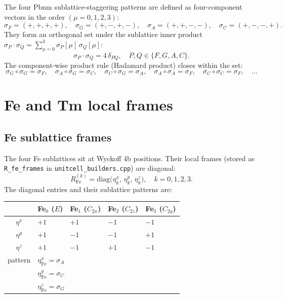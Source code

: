 \documentclass[11pt,a4paper]{article}
\newcommand{\sF}{\sigma_F}
\newcommand{\sG}{\sigma_G}
\newcommand{\sA}{\sigma_A}
\newcommand{\sC}{\sigma_C}
\newcommand{\etaz}{\eta^z}
\newcommand{\etax}{\eta^x}
\newcommand{\etay}{\eta^y}
\newcommand{\diag}{\mathrm{diag}}
\begin{document}
The four Pbnm sublattice-staggering patterns are defined as four-component
vectors in the order $(\mu=0,1,2,3)$:
\begin{equation}
  \sF = (+,+,+,+), \quad
  \sG = (+,-,+,-), \quad
  \sA = (+,+,-,-), \quad
  \sC = (+,-,-,+).
\end{equation}
They form an orthogonal set under the sublattice inner product
$\sigma_P \cdot \sigma_Q = \sum_{\mu=0}^{3} \sigma_P[\mu]\,\sigma_Q[\mu]$:
\begin{equation}
  \sigma_P \cdot \sigma_Q = 4\,\delta_{PQ},
  \quad P,Q \in \{F,G,A,C\}.
  \label{eq:orth}
\end{equation}
The component-wise product rule (Hadamard product) closes within the set:
\begin{equation}
  \sG \circ \sG = \sF, \quad
  \sA \circ \sG = \sC, \quad
  \sC \circ \sG = \sA, \quad
  \sA \circ \sA = \sF, \quad
  \sC \circ \sC = \sF, \quad \ldots
  \label{eq:had}
\end{equation}

\section{Fe and Tm local frames}
\label{sec:frames}

\subsection{Fe sublattice frames}

The four Fe sublattices sit at Wyckoff 4b positions.  Their local frames
(stored as \texttt{R\_fe\_frames} in \texttt{unitcell\_builders.cpp}) are
diagonal:
\begin{equation}
  R^{(k)}_{\mathrm{Fe}} = \diag\bigl(\eta^x_k,\,\eta^y_k,\,\eta^z_k\bigr),
  \quad k = 0,1,2,3.
\end{equation}
The diagonal entries and their sublattice patterns are:
\begin{center}
\begin{tabular}{cllll}
\toprule
 & Fe$_0$ ($E$) & Fe$_1$ ($C_{2x}$) & Fe$_2$ ($C_{2z}$) & Fe$_3$ ($C_{2y}$) \\
\midrule
$\eta^x$ & $+1$ & $+1$ & $-1$ & $-1$ \\
$\eta^y$ & $+1$ & $-1$ & $-1$ & $+1$ \\
$\eta^z$ & $+1$ & $-1$ & $+1$ & $-1$ \\
\midrule
pattern & \multicolumn{2}{l}{$\etax_{\mathrm{Fe}} = \sA$} & \multicolumn{2}{l}{} \\
        & \multicolumn{2}{l}{$\etay_{\mathrm{Fe}} = \sC$} & \multicolumn{2}{l}{} \\
        & \multicolumn{2}{l}{$\etaz_{\mathrm{Fe}} = \sG$} & \multicolumn{2}{l}{} \\
\bottomrule
\end{tabular}
\end{center}
\end{document}
